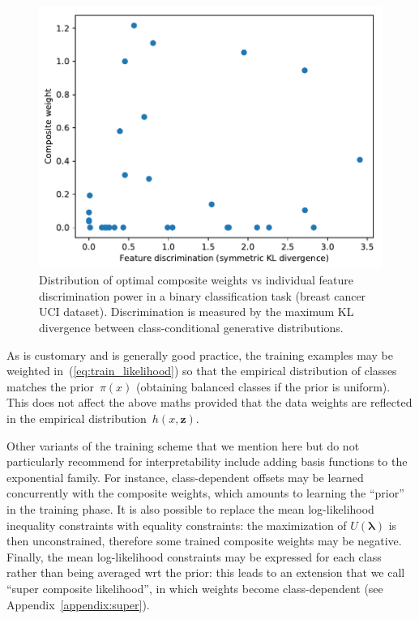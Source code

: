 \documentclass[english]{scrartcl}
\def\y{{\mathbf{y}}}
\def\y{{\mathbf{z}}}
\newcommand{\blambda}{{\boldsymbol{\lambda}}}
\begin{document}
\begin{figure}[!ht]
  \begin{center}
    \includegraphics[width=.6\textwidth]{disc_weight_plot.pdf}
  \end{center}
\caption{Distribution of optimal composite weights vs individual feature discrimination power in a binary classification task (breast cancer UCI dataset). Discrimination is measured by the maximum KL divergence between class-conditional generative distributions.}
\label{fig:disc_weight_plot}
\end{figure}


As is customary and is generally good practice, the training examples may be weighted in~(\ref{eq:train_likelihood}) so that the empirical distribution of classes matches the prior~$\pi(x)$ (obtaining balanced classes if the prior is uniform). This does not affect the above maths provided that the data weights are reflected in the empirical distribution~$h(x,\y)$. 

Other variants of the training scheme that we mention here but do not particularly recommend for interpretability include adding basis functions to the exponential family. For instance, class-dependent offsets may be learned concurrently with the composite weights, which amounts to learning the ``prior'' in the training phase. It is also possible to replace the mean log-likelihood inequality constraints with equality constraints: the maximization of $U(\blambda)$ is then unconstrained, therefore some trained composite weights may be negative. Finally, the mean log-likelihood constraints may be expressed for each class rather than being averaged wrt the prior: this leads to an extension that we call ``super composite likelihood'', in which weights become class-dependent (see Appendix~\ref{appendix:super}).


\end{document}
